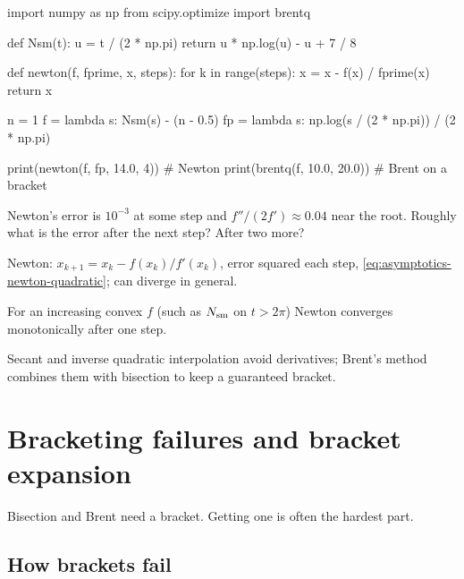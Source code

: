 \begin{pycode}
import numpy as np
from scipy.optimize import brentq

def Nsm(t):
    u = t / (2 * np.pi)
    return u * np.log(u) - u + 7 / 8

def newton(f, fprime, x, steps):
    for k in range(steps):
        x = x - f(x) / fprime(x)
    return x

n = 1
f  = lambda s: Nsm(s) - (n - 0.5)
fp = lambda s: np.log(s / (2 * np.pi)) / (2 * np.pi)

print(newton(f, fp, 14.0, 4))        # Newton
print(brentq(f, 10.0, 20.0))         # Brent on a bracket
\end{pycode}

\begin{checkpoint}
Newton's error is $10^{-3}$ at some step and $f''/(2f')\approx0.04$ near the root. Roughly what is the error after the next step? After two more?
\end{checkpoint}

\begin{keyideas}
\item Newton: $x_{k+1}=x_k-f(x_k)/f'(x_k)$, error squared each step, \cref{eq:asymptotics-newton-quadratic}; can diverge in general.
\item For an increasing convex $f$ (such as $N_{\mathrm{sm}}$ on $t>2\pi$) Newton converges monotonically after one step.
\item Secant and inverse quadratic interpolation avoid derivatives; Brent's method combines them with bisection to keep a guaranteed bracket.
\end{keyideas}

\section{Bracketing failures and bracket expansion}\label{sec:asymptotics-brackets}

Bisection and Brent need a bracket. Getting one is often the hardest part.

\subsection{How brackets fail}

